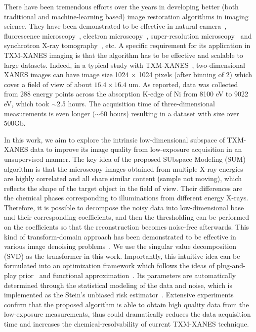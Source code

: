 \documentclass[10pt,twocolumn,letterpaper]{article}
\begin{document}
There have been tremendous efforts over the years in developing better (both traditional and machine-learning based) image restoration algorithms in imaging science. They have been demonstrated to be effective in natural camera~\cite{zhang2021plug,blu2007sure,mao2020image,dabov2007image,Pang_2021_CVPR}, fluorescence microscopy~\cite{luisier2010image,li2017pure,zhang2019poisson,krull2019noise2void,weigert2018content,chen2021three}, electron microscopy~\cite{bepler2020topaz,sheth2021unsupervised}, super-resolution microscopy~\cite{nehme2018deep} and synchrotron X-ray tomography~\cite{liu2020tomogan}, etc. A specific requirement for its application in TXM-XANES imaging is that the algorithm has to be effective and scalable to large datasets. Indeed, in a typical study with TXM-XANES~\cite{qian2021understanding}, two-dimensional XANES images can have image size 1024 $\times$ 1024 pixels (after binning of 2) which cover a field of view of about $16.4 \times 16.4$ um. As reported, data was collected from 288 energy points across the absorption K-edge of Ni from 8100 eV to 9022 eV, which took $\sim$2.5 hours. The acquisition time of three-dimensional measurements is even longer ($\sim$60 hours) resulting in a dataset with size over 500Gb. 

In this work, we aim to explore the intrinsic low-dimensional subspace of TXM-XANES data to improve its image quality from low-exposure acquisition in an unsupervised manner. The key idea of the proposed SUbspace Modeling (SUM) algorithm is that the microscopy images obtained from multiple X-ray energies are highly correlated and all share similar content (sample not moving), which reflects the shape of the target object in the field of view. Their differences are the chemical phases corresponding to illuminations from different energy X-rays. Therefore, it is possible to decompose the noisy data into low-dimensional base and their corresponding coefficients, and then the thresholding can be performed on the coefficients so that the reconstruction becomes noise-free afterwards. This kind of transform-domain approach has been demonstrated to be effective in various image denoising problems~\cite{starck2002curvelet,dabov2007image,blu2007sure}. We use the singular value decomposition (SVD) as the transformer in this work. Importantly, this intuitive idea can be formulated into an optimization framework which follows the ideas of plug-and-play prior~\cite{venkatakrishnan2013plug,wu2020simba} and functional approximation~\cite{blu2007sure,luisier2010image,li2017pure,gilliam2017local}. Its parameters are automatically determined through the statistical modeling of the data and noise, which is implemented as the Stein’s unbiased risk estimator~\cite{blu2007sure,stein1981estimation}. Extensive experiments confirm that the proposed algorithm is able to obtain high quality data from the low-exposure measurements, thus could dramatically reduces the data acquisition time and increases the chemical-resolvability of current TXM-XANES technique.
\end{document}
